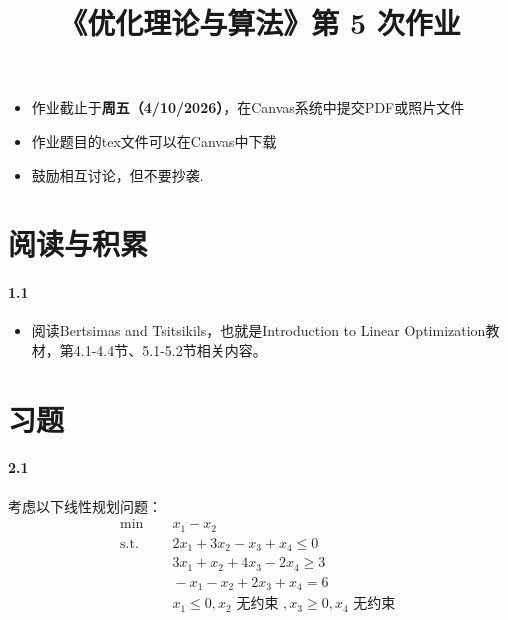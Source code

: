 \documentclass[12pt,a4paper]{article}
\begin{document}
\title{
{《优化理论与算法》第 5 次作业
}
}
\date{}


\maketitle

\begin{itemize}
	\item 作业截止于{\bf 周五（4/10/2026）}，在Canvas系统中提交PDF或照片文件
	\item 作业题目的tex文件可以在Canvas中下载
	\item 鼓励相互讨论，但不要抄袭.
\end{itemize}

\section{阅读与积累}
\paragraph{1.1}
\begin{itemize}
	\item 阅读Bertsimas and Tsitsikils，也就是Introduction to Linear Optimization教材，第4.1-4.4节、5.1-5.2节相关内容。
\end{itemize}

\section{习题}

\paragraph{2.1}
考虑以下线性规划问题：
\begin{align*}
\min \;&\quad x_1 - x_2 \\
\text{s.t.} \;&\quad2x_1 + 3x_2 - x_3 + x_4 \leq 0 \\
 \;&\quad3x_1 + x_2 + 4x_3 - 2x_4 \geq 3 \\
 \;&\quad-x_1 - x_2 + 2x_3 + x_4 = 6 \\
 \;&\quad x_1 \leq 0, x_2 \text{ 无约束 }, x_3 \geq 0, x_4 \text{ 无约束 }
\end{align*}
\end{document}
